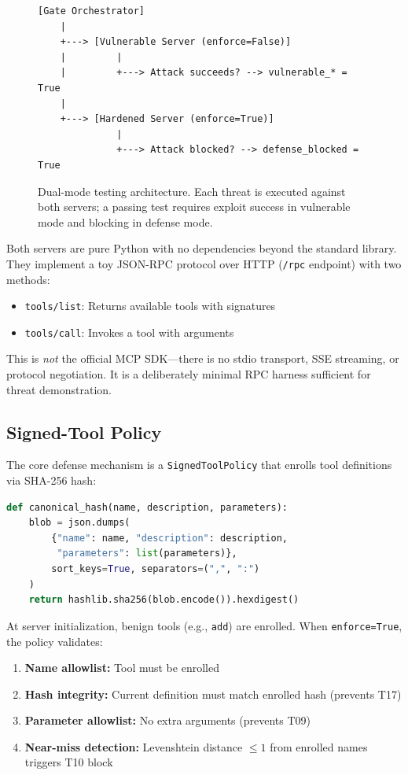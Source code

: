\documentclass[11pt]{article}
\begin{document}
\begin{figure}[ht]
\centering
\begin{verbatim}
[Gate Orchestrator]
    |
    +---> [Vulnerable Server (enforce=False)]
    |         |
    |         +---> Attack succeeds? --> vulnerable_* = True
    |
    +---> [Hardened Server (enforce=True)]
              |
              +---> Attack blocked? --> defense_blocked = True
\end{verbatim}
\caption{Dual-mode testing architecture. Each threat is executed against both servers; a passing test requires exploit success in vulnerable mode and blocking in defense mode.}
\label{fig:arch}
\end{figure}

Both servers are pure Python with no dependencies beyond the standard library. They implement a toy JSON-RPC protocol over HTTP (\texttt{/rpc} endpoint) with two methods:

\begin{itemize}
    \item \texttt{tools/list}: Returns available tools with signatures
    \item \texttt{tools/call}: Invokes a tool with arguments
\end{itemize}

This is \emph{not} the official MCP SDK—there is no stdio transport, SSE streaming, or protocol negotiation. It is a deliberately minimal RPC harness sufficient for threat demonstration.

\subsection{Signed-Tool Policy}

The core defense mechanism is a \texttt{SignedToolPolicy} that enrolls tool definitions via SHA-256 hash:

\begin{lstlisting}[language=Python]
def canonical_hash(name, description, parameters):
    blob = json.dumps(
        {"name": name, "description": description, 
         "parameters": list(parameters)},
        sort_keys=True, separators=(",", ":")
    )
    return hashlib.sha256(blob.encode()).hexdigest()
\end{lstlisting}

At server initialization, benign tools (e.g., \texttt{add}) are enrolled. When \texttt{enforce=True}, the policy validates:

\begin{enumerate}
    \item \textbf{Name allowlist:} Tool must be enrolled
    \item \textbf{Hash integrity:} Current definition must match enrolled hash (prevents T17)
    \item \textbf{Parameter allowlist:} No extra arguments (prevents T09)
    \item \textbf{Near-miss detection:} Levenshtein distance $\leq 1$ from enrolled names triggers T10 block
\end{enumerate}
\end{document}
